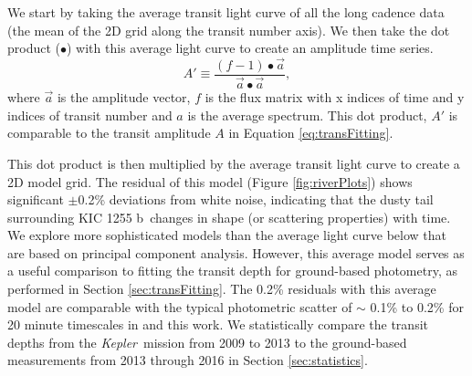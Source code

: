 \documentclass[preprint,trackchanges]{aastex61}
\newcommand{\sha}{KIC 1255 b}
\newcommand{\kepler}{{\it Kepler}}
\begin{document}
We start by taking the average transit light curve of all the long cadence data (the mean of the 2D grid along the transit number axis).
We then take the dot product ($\bullet$) with this average light curve to create an amplitude time series.
\begin{equation}
A' \equiv \frac{(f - 1) \bullet \vec{a}}{\vec{a} \bullet \vec{a}},
\end{equation}
where $\vec{a}$ is the amplitude vector, $f$ is the flux matrix with x indices of time and y indices of transit number and $a$ is the average spectrum.
This dot product, $A'$ is comparable to the transit amplitude $A$ in Equation \ref{eq:transFitting}.

This dot product is then multiplied by the average transit light curve to create a 2D model grid.
The residual of this model (Figure \ref{fig:riverPlots}) shows significant $\pm$0.2\% deviations from white noise, indicating that the dusty tail surrounding \sha\ changes in shape (or scattering properties) with time.
We explore more sophisticated models than the average light curve below that are based on principal component analysis.
However, this average model serves as a useful comparison to fitting the transit depth for ground-based photometry, as performed in Section \ref{sec:transFitting}.
The 0.2\% residuals with this average model are comparable with the typical photometric scatter of $\sim$ 0.1\% to 0.2\% for 20 minute timescales in \citet{schlawin2016kic1255} and this work.
We statistically compare the transit depths from the \kepler\ mission from 2009 to 2013 to the ground-based measurements from 2013 through 2016 in Section \ref{sec:statistics}.
\end{document}
